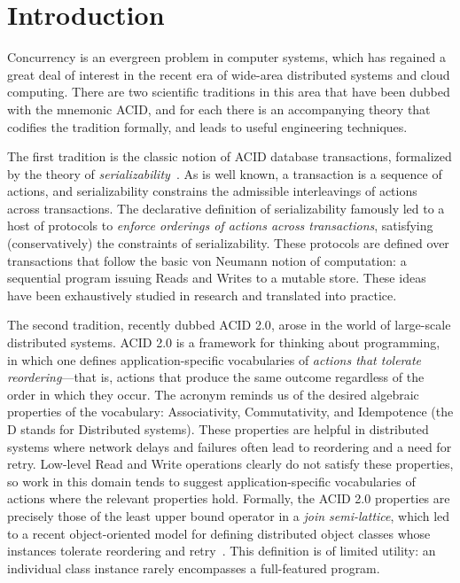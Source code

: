 \documentclass{sig-alternate}
\begin{document}
\section{Introduction}
Concurrency is an evergreen problem in computer systems, which has regained a
great deal of interest in the recent era of wide-area distributed systems and
cloud computing.  There are two scientific traditions in this area that have
been dubbed with the mnemonic \textsf{ACID}, and for each there is an
accompanying theory that codifies the tradition formally, and leads to useful
engineering techniques.

The first tradition is the classic notion of \textsf{ACID} database
transactions, formalized by the theory of \emph{serializability}~\cite{Papadimitriou1979}.
As is well known, a transaction is a sequence of actions, and serializability
constrains the admissible interleavings of actions across transactions.  The
declarative definition of serializability famously led to a host of protocols to
\emph{enforce orderings of actions across transactions}, satisfying
(conservatively) the constraints of serializability.  These protocols are
defined over transactions that follow the basic von Neumann notion of
computation: a sequential program issuing Reads and Writes to a mutable store.
These ideas have been exhaustively studied in research and translated into
practice.

The second tradition, recently dubbed \textsf{ACID 2.0}, arose in the world of
large-scale distributed systems.  ACID 2.0 is a framework for thinking about
programming, in which one defines application-specific vocabularies of
\emph{actions that tolerate reordering}---that is, actions that produce the same
outcome regardless of the order in which they occur.  The acronym reminds us of
the desired algebraic properties of the vocabulary: Associativity,
Commutativity, and Idempotence (the D stands for Distributed systems).  These
properties are helpful in distributed systems where network delays and failures
often lead to reordering and a need for retry. Low-level Read and Write
operations clearly do not satisfy these properties, so work in this domain tends
to suggest application-specific vocabularies of actions where the relevant
properties hold.  Formally, the ACID 2.0 properties are precisely those of the
least upper bound operator in a {\em join semi-lattice}, which led to a recent
object-oriented model for defining distributed object classes whose instances
tolerate reordering and retry~\cite{Shapiro2011a,Shapiro2011b}.  This definition is of limited
utility: an individual class instance rarely encompasses a full-featured
program.
\end{document}
